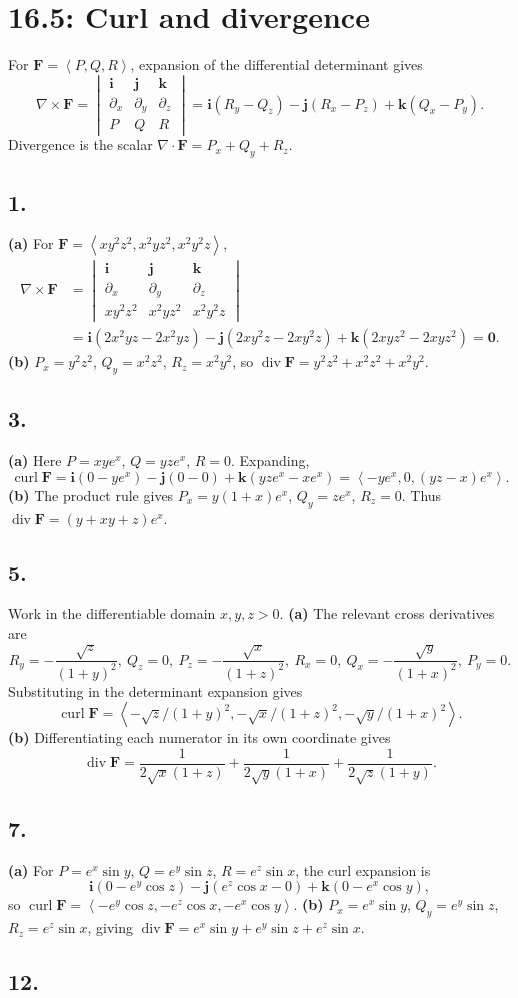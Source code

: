 \documentclass[11pt]{article}
\newcommand{\ex}[1]{\subsection*{#1.}}
\newcommand{\ans}[1]{\boxed{#1}}
\newcommand{\vv}[1]{\left\langle #1\right\rangle}
\newcommand{\ii}{\mathbf i}\newcommand{\jj}{\mathbf j}\newcommand{\kk}{\mathbf k}
\begin{document}
\clearpage\section*{16.5: Curl and divergence}
For $\mathbf F=\vv{P,Q,R}$, expansion of the differential determinant gives
\[\nabla\times\mathbf F=\begin{vmatrix}\ii&\jj&\kk\\\partial_x&\partial_y&\partial_z\\P&Q&R\end{vmatrix}
=\ii(R_y-Q_z)-\jj(R_x-P_z)+\kk(Q_x-P_y).\]
Divergence is the scalar $\nabla\cdot\mathbf F=P_x+Q_y+R_z$.
\ex{1}
\textbf{(a)} For $\mathbf F=\vv{xy^2z^2,x^2yz^2,x^2y^2z}$,
\begin{align*}
\nabla\times\mathbf F
&=\begin{vmatrix}\ii&\jj&\kk\\\partial_x&\partial_y&\partial_z\\xy^2z^2&x^2yz^2&x^2y^2z\end{vmatrix}\\
&=\ii(2x^2yz-2x^2yz)-\jj(2xy^2z-2xy^2z)+\kk(2xyz^2-2xyz^2)=\ans{\mathbf0}.
\end{align*}
\textbf{(b)} $P_x=y^2z^2$, $Q_y=x^2z^2$, $R_z=x^2y^2$, so $\ans{\operatorname{div}\mathbf F=y^2z^2+x^2z^2+x^2y^2}$.
\ex{3}
\textbf{(a)} Here $P=xye^x$, $Q=yze^x$, $R=0$. Expanding,
\[\operatorname{curl}\mathbf F=\ii(0-ye^x)-\jj(0-0)+\kk(yze^x-xe^x)
=\ans{\vv{-ye^x,0,(yz-x)e^x}}.\]
\textbf{(b)} The product rule gives $P_x=y(1+x)e^x$, $Q_y=ze^x$, $R_z=0$. Thus $\ans{\operatorname{div}\mathbf F=(y+xy+z)e^x}$.
\ex{5}
Work in the differentiable domain $x,y,z>0$. \textbf{(a)} The relevant cross derivatives are
\[R_y=-\frac{\sqrt z}{(1+y)^2},\ Q_z=0,\ P_z=-\frac{\sqrt x}{(1+z)^2},\ R_x=0,\ Q_x=-\frac{\sqrt y}{(1+x)^2},\ P_y=0.\]
Substituting in the determinant expansion gives
\[\ans{\operatorname{curl}\mathbf F=\vv{-\sqrt z/(1+y)^2,-\sqrt x/(1+z)^2,-\sqrt y/(1+x)^2}}.\]
\textbf{(b)} Differentiating each numerator in its own coordinate gives
\[\ans{\operatorname{div}\mathbf F=\frac1{2\sqrt x(1+z)}+\frac1{2\sqrt y(1+x)}+\frac1{2\sqrt z(1+y)}}.\]
\ex{7}
\textbf{(a)} For $P=e^x\sin y$, $Q=e^y\sin z$, $R=e^z\sin x$, the curl expansion is
\[\ii(0-e^y\cos z)-\jj(e^z\cos x-0)+\kk(0-e^x\cos y),\]
so $\ans{\operatorname{curl}\mathbf F=\vv{-e^y\cos z,-e^z\cos x,-e^x\cos y}}$.
\textbf{(b)} $P_x=e^x\sin y$, $Q_y=e^y\sin z$, $R_z=e^z\sin x$, giving $\ans{\operatorname{div}\mathbf F=e^x\sin y+e^y\sin z+e^z\sin x}$.
\ex{12}
\end{document}
